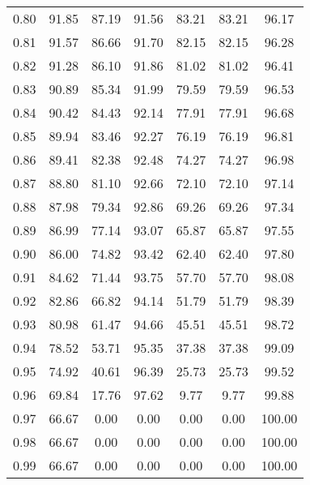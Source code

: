 \begin{tabular}{|c|c|c|c|c|c|c|}
      0.80 &     91.85 &     87.19 &      91.56 &   83.21 &      83.21 &         96.17 \\
      0.81 &     91.57 &     86.66 &      91.70 &   82.15 &      82.15 &         96.28 \\
      0.82 &     91.28 &     86.10 &      91.86 &   81.02 &      81.02 &         96.41 \\
      0.83 &     90.89 &     85.34 &      91.99 &   79.59 &      79.59 &         96.53 \\
      0.84 &     90.42 &     84.43 &      92.14 &   77.91 &      77.91 &         96.68 \\
      0.85 &     89.94 &     83.46 &      92.27 &   76.19 &      76.19 &         96.81 \\
      0.86 &     89.41 &     82.38 &      92.48 &   74.27 &      74.27 &         96.98 \\
      0.87 &     88.80 &     81.10 &      92.66 &   72.10 &      72.10 &         97.14 \\
      0.88 &     87.98 &     79.34 &      92.86 &   69.26 &      69.26 &         97.34 \\
      0.89 &     86.99 &     77.14 &      93.07 &   65.87 &      65.87 &         97.55 \\
      0.90 &     86.00 &     74.82 &      93.42 &   62.40 &      62.40 &         97.80 \\
      0.91 &     84.62 &     71.44 &      93.75 &   57.70 &      57.70 &         98.08 \\
      0.92 &     82.86 &     66.82 &      94.14 &   51.79 &      51.79 &         98.39 \\
      0.93 &     80.98 &     61.47 &      94.66 &   45.51 &      45.51 &         98.72 \\
      0.94 &     78.52 &     53.71 &      95.35 &   37.38 &      37.38 &         99.09 \\
      0.95 &     74.92 &     40.61 &      96.39 &   25.73 &      25.73 &         99.52 \\
      0.96 &     69.84 &     17.76 &      97.62 &    9.77 &       9.77 &         99.88 \\
      0.97 &     66.67 &      0.00 &       0.00 &    0.00 &       0.00 &        100.00 \\
      0.98 &     66.67 &      0.00 &       0.00 &    0.00 &       0.00 &        100.00 \\
      0.99 &     66.67 &      0.00 &       0.00 &    0.00 &       0.00 &        100.00 \\
\bottomrule
\end{tabular}
